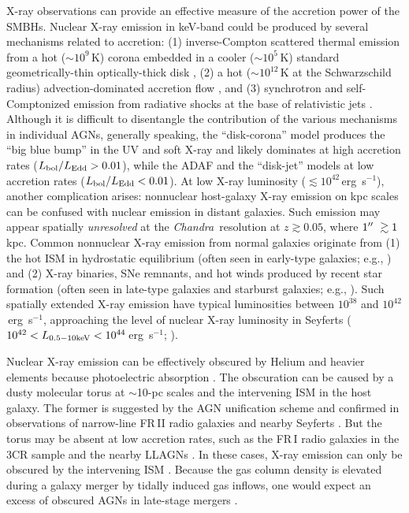 \documentclass[iop,revtex4,twocolumn,apj,numberedappendix,appendixfloats]{emulateapj}
\newcommand{\ergs}{erg~s$^{-1}$}
\newcommand{\chandra}{{\it Chandra}}
\begin{document}
X-ray observations can provide an effective measure of the accretion power of the SMBHs. Nuclear X-ray emission in keV-band could be produced by several mechanisms related to accretion: (1) inverse-Compton scattered thermal emission from a hot ($\sim10^9$\,K) corona \citep{Liang77,Haardt93} embedded in a cooler ($\sim10^5$\,K) standard geometrically-thin optically-thick disk \citep{Shakura73}, (2) a hot ($\sim10^{12}$\,K at the Schwarzschild radius) advection-dominated accretion flow \citep[ADAF; see][for a review]{Yuan14}, and (3) synchrotron and self-Comptonized emission from radiative shocks at the base of relativistic jets \citep{Yuan02}. Although it is difficult to disentangle the contribution of the various mechanisms in individual AGNs, generally speaking, the ``disk-corona'' model produces the ``big blue bump'' in the UV and soft X-ray and likely dominates at high accretion rates ($L_{\rm bol}/L_{\rm Edd} > 0.01$), while the ADAF and the ``disk-jet'' models at low accretion rates ($L_{\rm bol}/L_{\rm Edd} < 0.01$). 
%
At low X-ray luminosity ($\lesssim 10^{42}$\,\ergs), another complication arises: nonnuclear host-galaxy X-ray emission on kpc scales can be confused with nuclear emission in distant galaxies. Such emission may appear spatially {\it unresolved} at the \chandra\ resolution at $z \gtrsim 0.05$, where $1\mbox{$^{\prime\prime}$}\ \gtrsim 1$\,kpc. Common nonnuclear X-ray emission from normal galaxies originate from (1) the hot ISM in hydrostatic equilibrium (often seen in early-type galaxies; e.g., \citealt{Forman85}) and (2) X-ray binaries, SNe remnants, and hot winds produced by recent star formation (often seen in late-type galaxies and starburst galaxies; e.g., \citealt{Fabbiano89}). Such spatially extended X-ray emission have typical luminosities between $10^{38}$ and $10^{42}$\,\ergs, approaching the level of nuclear X-ray luminosity in Seyferts ($10^{42} < L_{\rm 0.5-10 keV} < 10^{44}$\,\ergs; \citealt{Brusa07}). 

Nuclear X-ray emission can be effectively obscured by Helium and heavier elements because photoelectric absorption \citep{Morrison83}. The obscuration can be caused by a dusty molecular torus at $\sim$10-pc scales and the intervening ISM in the host galaxy. The former is suggested by the AGN unification scheme \citep{Urry95} and confirmed in observations of narrow-line FR\,II radio galaxies \citep[e.g.,][]{Sambruna99} and nearby Seyferts \citep[e.g.,][]{Garcia-Burillo16,Gallimore16,Alonso-Herrero18,Fabbiano18}. But the torus may be absent at low accretion rates, such as the FR\,I radio galaxies in the 3CR sample \citep[e.g.,][]{Donato04,Balmaverde06,Evans06a} and the nearby LLAGNs \citep[e.g.,][]{Ho08}. In these cases, X-ray emission can only be obscured by the intervening ISM \citep[e.g.,][]{Gilli14}. Because the gas column density is elevated during a galaxy merger by tidally induced gas inflows, one would expect an excess of obscured AGNs in late-stage mergers \citep[e.g.,][]{Hopkins05a}.
\end{document}
